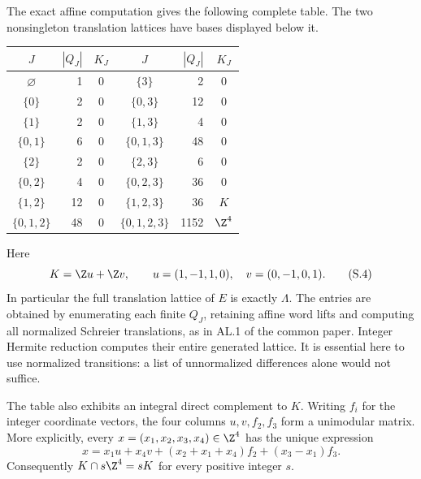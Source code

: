 The exact affine computation gives the following complete table. The
two nonsingleton translation lattices have bases displayed below it.
\begin{center}\begin{tabular}{c|r|c@{\qquad}c|r|c}
\toprule
$J$&$|Q_J|$&$K_J$&$J$&$|Q_J|$&$K_J$\\\midrule
$\varnothing$&1&0&$\{3\}$&2&0\\
$\{0\}$&2&0&$\{0,3\}$&12&0\\
$\{1\}$&2&0&$\{1,3\}$&4&0\\
$\{0,1\}$&6&0&$\{0,1,3\}$&48&0\\
$\{2\}$&2&0&$\{2,3\}$&6&0\\
$\{0,2\}$&4&0&$\{0,2,3\}$&36&0\\
$\{1,2\}$&12&0&$\{1,2,3\}$&36&$K$\\
$\{0,1,2\}$&48&0&$\{0,1,2,3\}$&1152&$\Z^4$\\\bottomrule
\end{tabular}\end{center}
Here
\[
 K=\Z u+\Z v,\qquad
 u=(1,-1,1,0),\quad v=(0,-1,0,1).                    \tag{S.4}
\]
In particular the full translation lattice of $E$ is exactly $\Lambda$.
The entries are obtained by enumerating each finite $Q_J$, retaining
affine word lifts and computing all normalized Schreier translations,
as in AL.1 of the common paper. Integer Hermite reduction computes
their entire generated lattice. It is essential here to use normalized
transitions: a list of unnormalized differences alone would not suffice.

The table also exhibits an integral direct complement to $K$.
Writing $f_i$ for the integer coordinate vectors, the four columns
$u,v,f_2,f_3$ form a unimodular matrix. More explicitly, every
$x=(x_1,x_2,x_3,x_4)\in\Z^4$ has the unique expression
\[
 x=x_1u+x_4v+(x_2+x_1+x_4)f_2+(x_3-x_1)f_3.        \tag{S.5}
\]
Consequently $K\cap s\Z^4=sK$ for every positive integer $s$.

